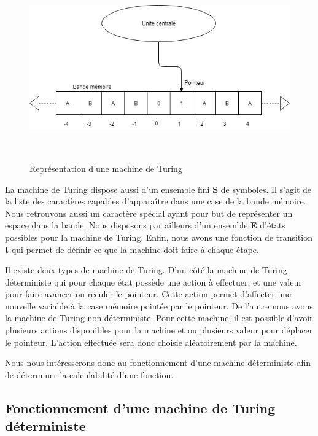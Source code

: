 \documentclass[12pt, twoside, openright]{report}
\begin{document}
\begin{figure}
    \begin{center}
        \includegraphics[height=8cm,width=12cm]{MachineDeTuring/MachineDeTuring.png}
        \caption{Représentation d'une machine de Turing}
        \label{fig:turing-1}
    \end{center}
\end{figure}
La machine de Turing dispose aussi d'un ensemble fini \textbf{S} de symboles. Il s'agit de la liste des caractères capables d'apparaître dans une case de la bande mémoire. Nous retrouvons aussi un caractère spécial ayant pour but de représenter un espace dans la bande. Nous disposons par ailleurs d'un ensemble \textbf{E} d'états possibles pour la machine de Turing. Enfin, nous avons une fonction de transition \textbf{t} qui permet de définir ce que la machine doit faire à chaque étape.

Il existe deux types de machine de Turing. D'un côté la machine de Turing déterministe qui pour chaque état possède une action à effectuer, et une valeur pour faire avancer ou reculer le pointeur. Cette action permet d'affecter une nouvelle variable à la case mémoire pointée par le pointeur. De l'autre nous avons la machine de Turing non déterministe. Pour cette machine, il est possible d'avoir plusieurs actions disponibles pour la machine et ou plusieurs valeur pour déplacer le pointeur. L'action effectuée sera donc choisie aléatoirement par la machine.

Nous nous intéresserons donc au fonctionnement d'une machine déterministe afin de déterminer la calculabilité d'une fonction. 

\subsection{Fonctionnement d'une machine de Turing déterministe}
\end{document}
